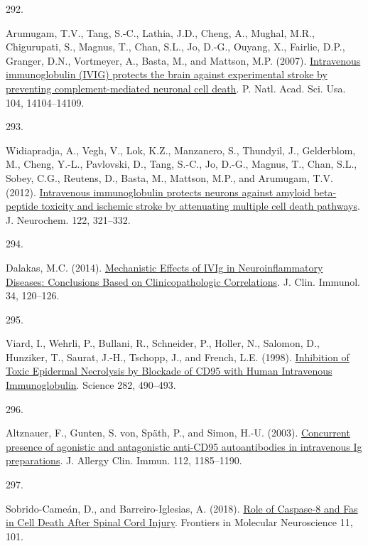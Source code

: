 \documentclass[
]{article}
\newlength{\cslhangindent}
\newlength{\csllabelwidth}
\newlength{\cslentryspacingunit} %
\newenvironment{CSLReferences}[2] %
 {%
  \setlength{\parindent}{0pt}
  \ifodd #1
  \let\oldpar\par
  \def\par{\hangindent=\cslhangindent\oldpar}
  \fi
  \setlength{\parskip}{#2\cslentryspacingunit}
 }%
 {}
\newcommand{\CSLLeftMargin}[1]{\parbox[t]{\csllabelwidth}{#1}}
\newcommand{\CSLRightInline}[1]{\parbox[t]{\linewidth - \csllabelwidth}{#1}\break}
\begin{document}
\begin{CSLReferences}{0}{0}
\leavevmode{}%
\CSLLeftMargin{292. }
\CSLRightInline{Arumugam, T.V., Tang, S.-C., Lathia, J.D., Cheng, A., Mughal, M.R., Chigurupati, S., Magnus, T., Chan, S.L., Jo, D.-G., Ouyang, X., Fairlie, D.P., Granger, D.N., Vortmeyer, A., Basta, M., and Mattson, M.P. (2007). \href{https://doi.org/10.1073/pnas.0700506104}{Intravenous immunoglobulin ({IVIG}) protects the brain against experimental stroke by preventing complement-mediated neuronal cell death}. P. Natl. Acad. Sci. Usa. 104, 14104--14109.}

\leavevmode{}%
\CSLLeftMargin{293. }
\CSLRightInline{Widiapradja, A., Vegh, V., Lok, K.Z., Manzanero, S., Thundyil, J., Gelderblom, M., Cheng, Y.-L., Pavlovski, D., Tang, S.-C., Jo, D.-G., Magnus, T., Chan, S.L., Sobey, C.G., Reutens, D., Basta, M., Mattson, M.P., and Arumugam, T.V. (2012). \href{https://doi.org/10.1111/j.1471-4159.2012.07754.x}{Intravenous immunoglobulin protects neurons against amyloid beta-peptide toxicity and ischemic stroke by attenuating multiple cell death pathways}. J. Neurochem. 122, 321--332.}

\leavevmode{}%
\CSLLeftMargin{294. }
\CSLRightInline{Dalakas, M.C. (2014). \href{https://doi.org/10.1007/s10875-014-0024-5}{Mechanistic {Effects} of {IVIg} in {Neuroinflammatory Diseases}: {Conclusions Based} on {Clinicopathologic Correlations}}. J. Clin. Immunol. 34, 120--126.}

\leavevmode{}%
\CSLLeftMargin{295. }
\CSLRightInline{Viard, I., Wehrli, P., Bullani, R., Schneider, P., Holler, N., Salomon, D., Hunziker, T., Saurat, J.-H., Tschopp, J., and French, L.E. (1998). \href{https://doi.org/10.1126/science.282.5388.490}{Inhibition of {Toxic Epidermal Necrolysis} by {Blockade} of {CD95} with {Human Intravenous Immunoglobulin}}. Science 282, 490--493.}

\leavevmode{}%
\CSLLeftMargin{296. }
\CSLRightInline{Altznauer, F., Gunten, S. von, Späth, P., and Simon, H.-U. (2003). \href{https://doi.org/10.1016/j.jaci.2003.09.045}{Concurrent presence of agonistic and antagonistic anti-{CD95} autoantibodies in intravenous {Ig} preparations}. J. Allergy Clin. Immun. 112, 1185--1190.}

\leavevmode{}%
\CSLLeftMargin{297. }
\CSLRightInline{Sobrido-Cameán, D., and Barreiro-Iglesias, A. (2018). \href{https://doi.org/10.3389/fnmol.2018.00101}{Role of {Caspase-8} and {Fas} in {Cell Death After Spinal Cord Injury}}. Frontiers in Molecular Neuroscience 11, 101.}


\end{CSLReferences}
\end{document}
